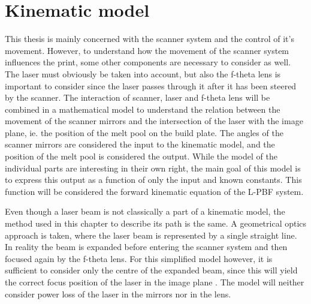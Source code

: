 \chapter{Kinematic model} \label{sec:kinematic-model}

This thesis is mainly concerned with the scanner system and the control of it's movement. However, to understand how the movement of the scanner system influences the print, some other components are necessary to consider as well. The laser must obviously be taken into account, but also the f-theta lens is important to consider since the laser passes through it after it has been steered by the scanner. The interaction of scanner, laser and f-theta lens  will be combined in a mathematical model to understand the relation between the movement of the scanner mirrors and the intersection of the laser with the image plane, ie. the position of the melt pool on the build plate. The angles of the scanner mirrors are considered the input to the kinematic model, and the position of the melt pool is considered the output. While the model of the individual parts are interesting in their own right, the main goal of this model is to express this output as a function of only the input and known constants. This function will be considered the forward kinematic equation of the L-PBF system.

Even though a laser beam is not classically a part of a kinematic model, the method used in this chapter to describe its path is the same. A geometrical optics approach is taken, where the laser beam is represented by a single straight line. In reality the beam is expanded before entering the scanner system and then focused again by the f-theta lens. For this simplified model however, it is sufficient to consider only the centre of the expanded beam, since this will yield the correct focus position of the laser in the image plane \cite{geometrical-optics}. The model will neither consider power loss of the laser in the mirrors nor in the lens.

